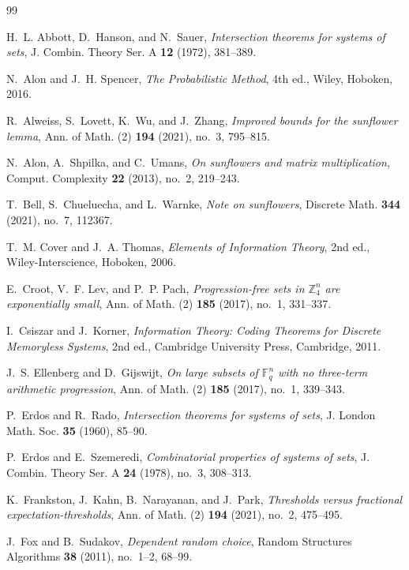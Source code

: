 \documentclass[11pt]{article}
\begin{document}
\begin{thebibliography}{99}

H.~L. Abbott, D.~Hanson, and N.~Sauer,
\emph{Intersection theorems for systems of sets},
J. Combin. Theory Ser. A \textbf{12} (1972), 381--389.

N.~Alon and J.~H. Spencer,
\emph{The Probabilistic Method},
4th ed., Wiley, Hoboken, 2016.

R.~Alweiss, S.~Lovett, K.~Wu, and J.~Zhang,
\emph{Improved bounds for the sunflower lemma},
Ann. of Math. (2) \textbf{194} (2021), no.~3, 795--815.

N.~Alon, A.~Shpilka, and C.~Umans,
\emph{On sunflowers and matrix multiplication},
Comput. Complexity \textbf{22} (2013), no.~2, 219--243.

T.~Bell, S.~Chueluecha, and L.~Warnke,
\emph{Note on sunflowers},
Discrete Math. \textbf{344} (2021), no.~7, 112367.

T.~M. Cover and J.~A. Thomas,
\emph{Elements of Information Theory},
2nd ed., Wiley-Interscience, Hoboken, 2006.

E.~Croot, V.~F. Lev, and P.~P. Pach,
\emph{Progression-free sets in $\mathbb Z_4^n$ are exponentially small},
Ann. of Math. (2) \textbf{185} (2017), no.~1, 331--337.

I.~Csiszar and J.~Korner,
\emph{Information Theory: Coding Theorems for Discrete Memoryless Systems},
2nd ed., Cambridge University Press, Cambridge, 2011.

J.~S. Ellenberg and D.~Gijswijt,
\emph{On large subsets of $\mathbb F_q^n$ with no three-term arithmetic
progression},
Ann. of Math. (2) \textbf{185} (2017), no.~1, 339--343.

P.~Erdos and R.~Rado,
\emph{Intersection theorems for systems of sets},
J. London Math. Soc. \textbf{35} (1960), 85--90.

P.~Erdos and E.~Szemeredi,
\emph{Combinatorial properties of systems of sets},
J. Combin. Theory Ser. A \textbf{24} (1978), no.~3, 308--313.

K.~Frankston, J.~Kahn, B.~Narayanan, and J.~Park,
\emph{Thresholds versus fractional expectation-thresholds},
Ann. of Math. (2) \textbf{194} (2021), no.~2, 475--495.

J.~Fox and B.~Sudakov,
\emph{Dependent random choice},
Random Structures Algorithms \textbf{38} (2011), no.~1--2, 68--99.


\end{thebibliography}
\end{document}
